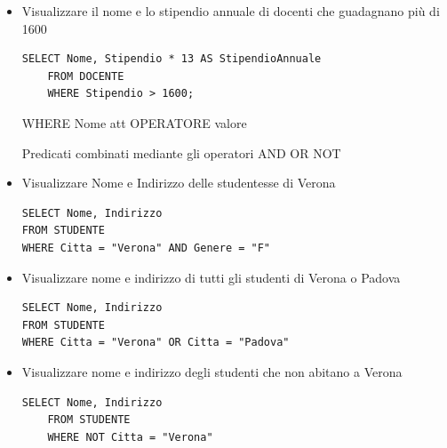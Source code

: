 \documentclass{article}
\begin{document}
\begin{itemize}
\item Visualizzare il nome e lo stipendio annuale di docenti che guadagnano più di 1600
	\begin{lstlisting}[style=sqlstyle]
	SELECT Nome, Stipendio * 13 AS StipendioAnnuale
	FROM DOCENTE
	WHERE Stipendio > 1600;
\end{lstlisting} 

WHERE Nome att OPERATORE valore

Predicati combinati mediante gli operatori AND OR NOT

\item Visualizzare Nome e Indirizzo delle studentesse di Verona
	\begin{lstlisting}[style=sqlstyle]
SELECT Nome, Indirizzo
FROM STUDENTE
WHERE Citta = "Verona" AND Genere = "F"
\end{lstlisting} 

\item Visualizzare nome e indirizzo di tutti gli studenti di Verona o Padova
	\begin{lstlisting}[style=sqlstyle]
SELECT Nome, Indirizzo
FROM STUDENTE
WHERE Citta = "Verona" OR Citta = "Padova"
\end{lstlisting} 

\item Visualizzare nome e indirizzo degli studenti che non abitano a Verona
	\begin{lstlisting}[style=sqlstyle]
	SELECT Nome, Indirizzo
	FROM STUDENTE
	WHERE NOT Citta = "Verona"
\end{lstlisting} 
\end{itemize}

\end{document}
